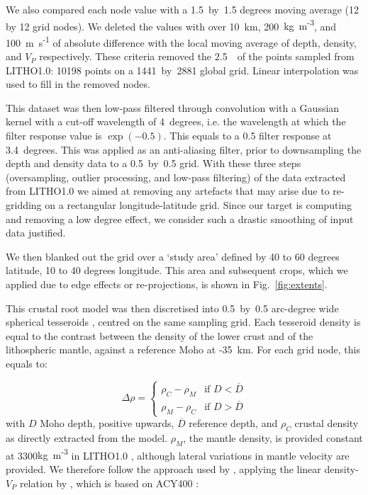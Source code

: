 We also compared each node value with a {1.5}~by~{1.5} degrees moving average (12 by 12 grid nodes). We deleted the values with over 10~km, 200~{kg~m\textsuperscript{-3}}, and 100~{m~s\textsuperscript{-1}} of absolute difference with the local moving average of depth, density, and $V_P$ respectively.
These criteria removed the {2.5}~\textperthousand~of the points sampled from {LITHO1.0}: 10198 points on a 1441~by~2881 global grid.
Linear interpolation was used to fill in the removed nodes.

This dataset was then low-pass filtered through convolution with a Gaussian kernel with a cut-off wavelength of 4~degrees, i.e. the wavelength at which the filter response value is $\exp(-0.5)$.
This equals to a {0.5} filter response at {3.4}~degrees.
This was applied as an anti-aliasing filter, prior to downsampling the depth and density data to a {0.5}~by~{0.5} grid.
With these three steps (oversampling, outlier processing, and low-pass filtering) of the data extracted from {LITHO1.0} we aimed at removing any artefacts that may arise due to re-gridding on a rectangular longitude-latitude grid.
Since our target is computing and removing a low degree effect, we consider such a drastic smoothing of input data justified.

We then blanked out the grid over a `study area' defined by 40 to 60 degrees latitude, 10 to 40 degrees longitude.
This area and subsequent crops, which we applied due to edge effects or re-projections, is shown in Fig.~\ref{fig:extents}.

This crustal root model was then discretised into {0.5}~by~{0.5} arc-degree wide spherical tesseroids \parencite{Uieda2016}, centred on the same sampling grid.
Each tesseroid density is equal to the contrast between the density of the lower crust and of the lithospheric mantle, against a reference Moho at {-35}~km.
For each grid node, this equals to:

\begin{equation}
	\label{eq:RhoContrast}
	\Delta \rho = \begin{cases}
		\rho_{C} - \rho_{M} & \mbox{if } D < \overline{D} \\ 
	    \rho_{M} - \rho_{C} & \mbox{if } D > \overline{D}
    \end{cases}
\end{equation}
with $D$ Moho depth, positive upwards, $\overline{D}$ reference depth, and $\rho_{C}$ crustal density as directly extracted from the model.
$\rho_{M}$, the mantle density, is provided constant at 3300{kg~m\textsuperscript{-3}} in {LITHO1.0} \parencite{Pasyanos2014}, although lateral variations in mantle velocity are provided.
We therefore follow the approach used by \textcite{Sebera2018}, applying the linear density-$V_P$ relation by \textcite{Yegorova2015}, which is based on {ACY400} \parencite{Montagner1989}:

